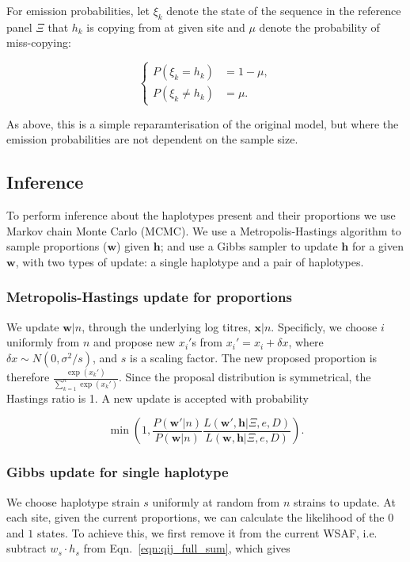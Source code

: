\documentclass{bioinfo}
\begin{document}
For emission probabilities, let $\xi_k$ denote the state of the sequence in the reference panel $\Xi$ that $h_k$ is copying from at given site and $\mu$ denote the probability of miss-copying:

$$
\begin{cases}
P(\xi_k = h_k) &= 1-\mu, \\
P(\xi_k \neq h_k) &= \mu.
\end{cases}
$$

\noindent As above, this is a simple reparamterisation of the original model, but where the emission probabilities are not dependent on the sample size.




\subsection{Inference}

To perform inference about the haplotypes present and their proportions we use Markov chain Monte Carlo (MCMC). We use a Metropolis-Hastings algorithm to sample proportions ($\mathbf w$) given $\mathbf h$; and use a Gibbs sampler to update $\mathbf h$ for a given $\mathbf w$, with two types of update: a single haplotype and a pair of haplotypes.


\subsubsection{Metropolis-Hastings update for proportions}\label{sec:updateP}

We update $\mathbf{w}|n$, through the underlying log titres, $\mathbf{x}|n$. Specificly, we choose $i$ uniformly from $n$ and propose new $x_i'$s from $x_i' = x_i + \delta x$, where $\delta x \sim N(0, \sigma^2/s)$, and $s$ is a scaling factor. The new proposed proportion is therefore $\frac{\exp(x_k')}{\sum_{k=1}^n \exp(x_k')}$. Since the proposal distribution is symmetrical, the Hastings ratio is 1. A new update is accepted with probability

 $$\min\left(1, \frac{P(\mathbf{w}'|n)}{P(\mathbf{w}|n)} \frac{L(\mathbf{w}', \mathbf{h} | \Xi, e, D)}{L(\mathbf{w}, \mathbf{h} | \Xi, e, D)}\right).$$



\subsubsection{Gibbs update for single haplotype}

We choose haplotype strain $s$ uniformly at random from $n$ strains to update.  At each site, given the current proportions, we can calculate the likelihood of the $0$ and $1$ states.  To achieve this, we first remove it from the current WSAF, i.e. subtract $ w_s \cdot h_s$ from Eqn.~\eqref{eqn:qij_full_sum}, which gives
\end{document}
